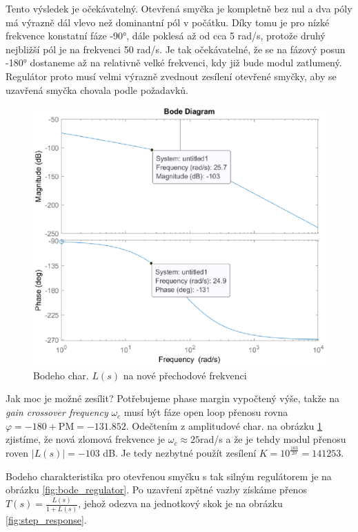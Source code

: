 \documentclass[twoside]{article}
\begin{document}
Tento výsledek je očekávatelný. Otevřená smyčka je kompletně bez nul a dva póly má výrazně dál
vlevo než dominantní pól v počátku. Díky tomu je pro nízké frekvence konstatní fáze -90°,
dále poklesá až od cca 5 rad/s, protože druhý nejbližší pól je na frekvenci 50 rad/s.
Je tak očekávatelné, že se na fázový posun -180° dostaneme až na relativně velké frekvenci,
kdy již bude modul zatlumený. Regulátor proto musí velmi výrazně zvednout zesílení otevřené smyčky,
aby se uzavřená smyčka chovala podle požadavků.

\begin{figure}
	\includegraphics[width=\linewidth]{bode_crossover.eps}
	\caption{Bodeho char. $L(s)$ na nové přechodové frekvenci}
	\label{fig:bode_crossover}
\end{figure}

Jak moc je možné zesílit? Potřebujeme phase margin vypočtený výše, takže na \textit{gain crossover frequency} $\omega_c$
musí být fáze open loop přenosu rovna $\varphi = -180 + \text{PM} = -131.852$. Odečtením z 
amplitudové char. na obrázku \ref{fig:bode_crossover} zjistíme, že
nová zlomová frekvence je $\omega_c \approx 25$rad/s a že je tehdy modul 
přenosu roven $|L(s)| = -103$ dB. Je tedy nezbytné použít zesílení $K = 10^\frac{103}{20} = 141253$.

Bodeho charakteristika pro otevřenou smyčku s tak silným regulátorem je na obrázku \ref{fig:bode_regulator}.
Po uzavření zpětné vazby získáme přenos $T(s) =\frac{L(s)}{1+L(s)}$, jehož odezva na jednotkový skok je na obrázku \ref{fig:step_response}.
\end{document}
